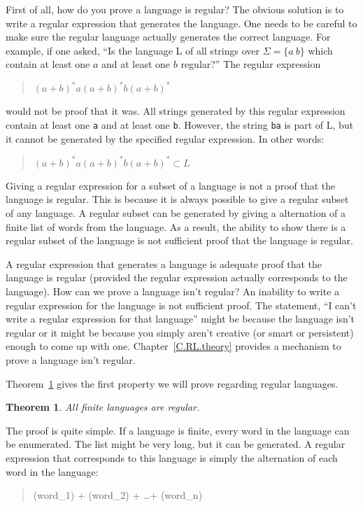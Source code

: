 \documentclass[letterpaper,12pt,openany,reqno]{book}%
\newcommand{\code}[1] {\lstinline[breaklines=yes,breakatwhitespace=yes]{#1}}
\newtheorem{theorem}{Theorem}
\begin{document}
First of all, how do you prove a language is regular? The obvious solution is to write a regular expression that generates the language. One needs to be careful to make sure the regular language actually generates the correct language. For example, if one asked, ``Is the language L of all strings over $\Sigma = \{a\ b\}$ which contain at least one $a$ and at least one $b$ regular?''
The regular expression
\begin{quote}
$(a+b)^*a(a+b)^*b(a+b)^*$
\end{quote}
would not be proof that it was. All strings generated by this regular expression contain at least one \code{a} and at least one \code{b}. However, the string \code{ba} is part of L, but it cannot be generated by the specified regular expression. In other words:
\begin{quote}
$(a+b)^*a(a+b)^*b(a+b)^* \subset L$
\end{quote}

Giving a regular expression for a subset of a language is not a proof that the language is regular. This is because it is always possible to give a regular subset of any language. A regular subset can be generated by giving a alternation of a finite list of words from the language. As a result, the ability to show there is a regular subset of the language is not sufficient proof that the language is regular.

A regular expression that generates a language is adequate proof that the language is regular (provided the regular expression actually corresponds to the language). How can we prove a language isn't regular? An inability to write a regular expression for the language is not sufficient proof. The statement, ``I can't write a regular expression for that language'' might be because the language isn't regular or it might be because you simply aren't creative (or smart or persistent) enough to come up with one. Chapter~\ref{C.RL.theory} provides a mechanism to prove a language isn't regular. 

Theorem~\ref{TH.finite.languages} gives the first property we will prove regarding regular languages.
\begin{theorem}
\label{TH.finite.languages}
All finite languages are regular.
\end{theorem}

The proof is quite simple. If a language is finite, every word in the language can be enumerated. The list might be very long, but it can be generated. A regular expression that corresponds to this language is simply the alternation of each word in the language:
\begin{quote}
(word\_1) + (word\_2) + \dots + (word\_n)
\end{quote}
\end{document}
